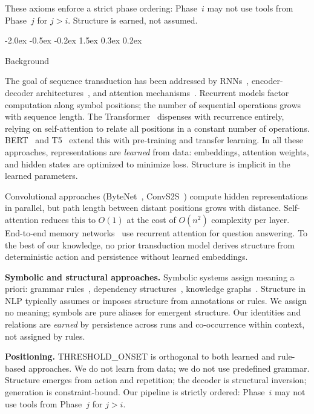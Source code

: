 \documentclass[10pt]{article}
\makeatletter
\renewcommand{\section}{\@startsection{section}{1}{\z@}%
  {-2.0ex \@plus -0.5ex \@minus -0.2ex}%
  {1.5ex \@plus 0.3ex \@minus 0.2ex}%
  {\large\bfseries\raggedright}}
\makeatother
\begin{document}
These axioms enforce a strict phase ordering: Phase~$i$ may not use tools from
Phase~$j$ for $j > i$. Structure is earned, not assumed.

\section{Background}
\label{sec:background}

The goal of sequence transduction has been addressed by
RNNs~\cite{hochreiter1997long}, encoder-decoder
architectures~\cite{sutskever2014sequence}, and attention
mechanisms~\cite{bahdanau2015neural}. Recurrent models factor computation along
symbol positions; the number of sequential operations grows with sequence length. The
Transformer~\cite{vaswani2017attention} dispenses with recurrence entirely, relying on
self-attention to relate all positions in a constant number of operations.
BERT~\cite{devlin2019bert} and T5~\cite{raffel2019t5} extend this with pre-training
and transfer learning. In all these approaches, representations are \emph{learned} from
data: embeddings, attention weights, and hidden states are optimized to minimize loss.
Structure is implicit in the learned parameters.

Convolutional approaches (ByteNet~\cite{kalchbrenner2016bytenet},
ConvS2S~\cite{gehring2017conv}) compute hidden representations in parallel, but path
length between distant positions grows with distance. Self-attention reduces this to
$O(1)$ at the cost of $O(n^2)$ complexity per layer. End-to-end memory
networks~\cite{sukhbaatar2015end} use recurrent attention for question answering.
To the best of our knowledge, no prior transduction model derives structure from
deterministic action and persistence without learned embeddings.

\textbf{Symbolic and structural approaches.}
Symbolic systems assign meaning a priori: grammar
rules~\cite{chomsky1957syntactic}, dependency
structures~\cite{de2008dependency}, knowledge
graphs~\cite{lehmann2015dbpedia}. Structure in NLP typically assumes or imposes
structure from annotations or rules. We assign no meaning; symbols are pure aliases for
emergent structure. Our identities and relations are \emph{earned} by persistence across
runs and co-occurrence within context, not assigned by rules.

\textbf{Positioning.}
THRESHOLD\_ONSET is orthogonal to both learned and rule-based approaches.
We do not learn from data; we do not use predefined grammar. Structure emerges from
action and repetition; the decoder is structural inversion; generation is
constraint-bound. Our pipeline is strictly ordered: Phase~$i$ may not use tools from
Phase~$j$ for $j > i$.
\end{document}
